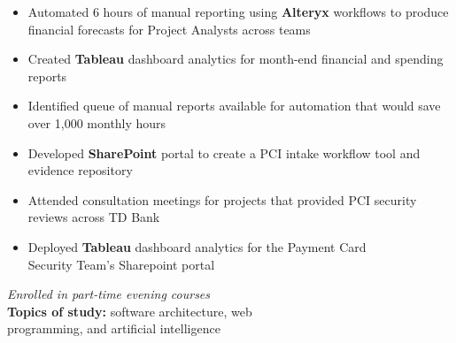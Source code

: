 \documentclass[10pt,a4paper,ragged2e,withhyper]{altacv}
\begin{document}
\begin{paracol}{2}
        \begin{itemize}
            \item Automated 6 hours of manual reporting using \textbf{Alteryx} workflows to produce financial forecasts for Project Analysts across teams
            \item Created \textbf{Tableau} dashboard analytics for month-end financial and spending reports
            \item Identified queue of manual reports available for automation that would save over 1,000 monthly hours
        \end{itemize}
        
        \medskip
        
        \begin{itemize}
            \item Developed \textbf{SharePoint} portal to create a PCI intake workflow tool and evidence repository
            \item Attended consultation meetings for projects that provided PCI security reviews across TD Bank
            \item Deployed \textbf{Tableau} dashboard analytics for the Payment Card\\ Security Team's Sharepoint portal
    
        \end{itemize}
        
        \medskip
        
        \newpage
        
        \switchcolumn
        
        
        \textit{Enrolled in part-time evening courses}\\
        \medskip
        \textbf{Topics of study:} software architecture, web\\ programming, and artificial intelligence\\
        

\end{paracol}
\end{document}
